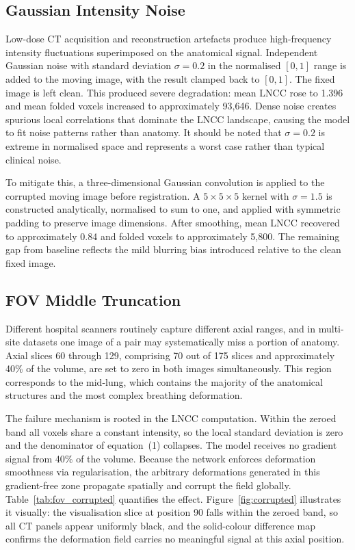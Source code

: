 \documentclass[11pt]{article}
\begin{document}
\subsection{Gaussian Intensity Noise}

Low-dose CT acquisition and reconstruction artefacts produce high-frequency
intensity fluctuations superimposed on the anatomical signal. Independent
Gaussian noise with standard deviation $\sigma = 0.2$ in the normalised
$[0, 1]$ range is added to the moving image, with the result clamped back
to $[0, 1]$. The fixed image is left clean. This produced severe degradation:
mean LNCC rose to 1.396 and mean folded voxels increased to approximately
93{,}646. Dense noise creates spurious local correlations that dominate the
LNCC landscape, causing the model to fit noise patterns rather than anatomy.
It should be noted that $\sigma = 0.2$ is extreme in normalised space and
represents a worst case rather than typical clinical noise.

To mitigate this, a three-dimensional Gaussian convolution is applied to the
corrupted moving image before registration. A $5 \times 5 \times 5$ kernel
with $\sigma = 1.5$ is constructed analytically, normalised to sum to one,
and applied with symmetric padding to preserve image dimensions. After
smoothing, mean LNCC recovered to approximately 0.84 and folded voxels to
approximately 5{,}800. The remaining gap from baseline reflects the mild
blurring bias introduced relative to the clean fixed image.

\subsection{FOV Middle Truncation}

Different hospital scanners routinely capture different axial ranges, and in
multi-site datasets one image of a pair may systematically miss a portion of
anatomy. Axial slices 60 through 129, comprising 70 out of 175 slices and
approximately 40\% of the volume, are set to zero in both images
simultaneously. This region corresponds to the mid-lung, which contains the
majority of the anatomical structures and the most complex breathing
deformation.

The failure mechanism is rooted in the LNCC computation. Within the zeroed
band all voxels share a constant intensity, so the local standard deviation
is zero and the denominator of equation~(1) collapses. The model receives no
gradient signal from 40\% of the volume. Because the network enforces
deformation smoothness via regularisation, the arbitrary deformations
generated in this gradient-free zone propagate spatially and corrupt the
field globally. Table~\ref{tab:fov_corrupted} quantifies the effect.
Figure~\ref{fig:corrupted} illustrates it visually: the visualisation slice
at position 90 falls within the zeroed band, so all CT panels appear
uniformly black, and the solid-colour difference map confirms the deformation
field carries no meaningful signal at this axial position.
\end{document}
